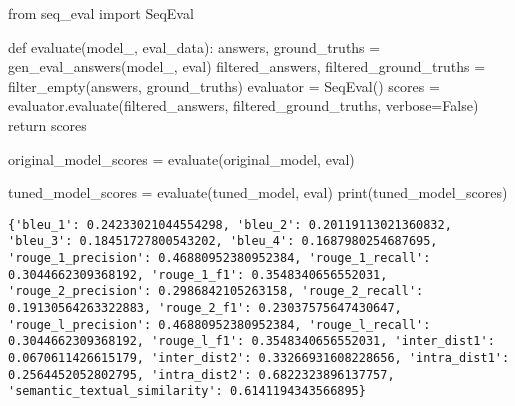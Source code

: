 \documentclass[
  letterpaper,
  DIV=11,
  numbers=noendperiod]{scrreprt}
\newenvironment{Shaded}{\begin{snugshade}}{\end{snugshade}}
\newcommand{\BuiltInTok}[1]{\textcolor[rgb]{0.00,0.23,0.31}{#1}}
\newcommand{\ControlFlowTok}[1]{\textcolor[rgb]{0.00,0.23,0.31}{#1}}
\newcommand{\ImportTok}[1]{\textcolor[rgb]{0.00,0.46,0.62}{#1}}
\newcommand{\KeywordTok}[1]{\textcolor[rgb]{0.00,0.23,0.31}{#1}}
\newcommand{\NormalTok}[1]{\textcolor[rgb]{0.00,0.23,0.31}{#1}}
\newcommand{\OperatorTok}[1]{\textcolor[rgb]{0.37,0.37,0.37}{#1}}
\newcommand{\VariableTok}[1]{\textcolor[rgb]{0.07,0.07,0.07}{#1}}
\begin{document}
\begin{Shaded}
\begin{Highlighting}[]
\ImportTok{from}\NormalTok{ seq\_eval }\ImportTok{import}\NormalTok{ SeqEval}

\KeywordTok{def}\NormalTok{ evaluate(model\_, eval\_data):}
\NormalTok{  answers, ground\_truths }\OperatorTok{=}\NormalTok{ gen\_eval\_answers(model\_, }\BuiltInTok{eval}\NormalTok{)}
\NormalTok{  filtered\_answers, filtered\_ground\_truths }\OperatorTok{=}\NormalTok{ filter\_empty(answers, ground\_truths)}
\NormalTok{  evaluator }\OperatorTok{=}\NormalTok{ SeqEval()}
\NormalTok{  scores }\OperatorTok{=}\NormalTok{ evaluator.evaluate(filtered\_answers, filtered\_ground\_truths, verbose}\OperatorTok{=}\VariableTok{False}\NormalTok{)}
  \ControlFlowTok{return}\NormalTok{ scores}
\end{Highlighting}
\end{Shaded}

\begin{Shaded}
\begin{Highlighting}[]
\NormalTok{original\_model\_scores }\OperatorTok{=}\NormalTok{ evaluate(original\_model, }\BuiltInTok{eval}\NormalTok{)}
\end{Highlighting}
\end{Shaded}

\begin{Shaded}
\begin{Highlighting}[]
\NormalTok{tuned\_model\_scores }\OperatorTok{=}\NormalTok{ evaluate(tuned\_model, }\BuiltInTok{eval}\NormalTok{)}
\BuiltInTok{print}\NormalTok{(tuned\_model\_scores)}
\end{Highlighting}
\end{Shaded}

\begin{verbatim}
{'bleu_1': 0.24233021044554298, 'bleu_2': 0.20119113021360832, 'bleu_3': 0.18451727800543202, 'bleu_4': 0.1687980254687695, 'rouge_1_precision': 0.46880952380952384, 'rouge_1_recall': 0.3044662309368192, 'rouge_1_f1': 0.3548340656552031, 'rouge_2_precision': 0.2986842105263158, 'rouge_2_recall': 0.19130564263322883, 'rouge_2_f1': 0.23037575647430647, 'rouge_l_precision': 0.46880952380952384, 'rouge_l_recall': 0.3044662309368192, 'rouge_l_f1': 0.3548340656552031, 'inter_dist1': 0.0670611426615179, 'inter_dist2': 0.33266931608228656, 'intra_dist1': 0.2564452052802795, 'intra_dist2': 0.6822323896137757, 'semantic_textual_similarity': 0.6141194343566895}
\end{verbatim}
\end{document}
